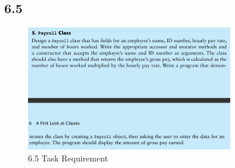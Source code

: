\documentclass{article}
\begin{document}
\subsection*{6.5}

\begin{figure}[H]
    \centering
    \includegraphics[width=0.8\textwidth]{./Assets/Task requirements/Assignment7/6.5.png}
    \caption{6.5 Task Requirement}
\end{figure}
\end{document}
